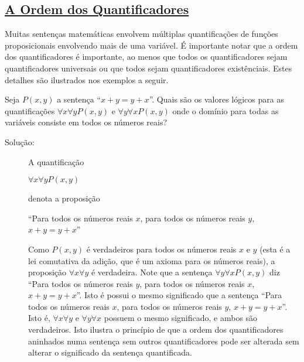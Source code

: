 \subsection*{\underline{A Ordem dos Quantificadores}}

Muitas sentenças matemáticas envolvem múltiplas quantificações de funções
proposicionais envolvendo mais de uma variável. É importante notar que a ordem
dos quantificadores é importante, ao menos que todos os quantificadores sejam
quantificadores universais ou que todos sejam quantificadores existênciais.
Estes detalhes são ilustrados nos exemplos a seguir.

\begin{exmp}
\label{exem150}
Seja $P(x,y)$ a sentença ``$x+y=y+x$''. Quais são os valores lógicos para as
quantificações $\forall x\forall yP(x,y)$ e $\forall y\forall xP(x,y)$ onde o
domínio para todas as variáveis consiste em todos os números reais?
\begin{description}
\item[Solução:]A quantificação
\begin{center}
$\forall x\forall yP(x,y)$
\end{center}
denota a proposição
\begin{center}
``Para todos os números reais $x$, para todos os números reais $y$, $x+y=y+x$''
\end{center}
Como $P(x,y)$ é verdadeiros para todos os números reais $x$ e $y$ (esta é a lei
comutativa da adição, que é um axioma para os números reais), a proposição
$\forall x\forall y$ é verdadeira. Note que a sentença $\forall y\forall
xP(x,y)$ diz ``Para todos os números reais $y$, para todos os números reais $x$,
$x+y=y+x$''. Isto é possui o mesmo significado que a sentença ``Para todos os
números reais $x$, para todos os números reais $y$, $x+y=y+x$''. Isto é,
$\forall x\forall y$ e $\forall y\forall x$ possuem o mesmo significado, e ambos
são verdadeiros. Isto ilustra o princípio de que a ordem dos quantificadores
aninhados numa sentença sem outros quantificadores pode ser alterada sem alterar
o significado da sentença quantificada.
\end{description}
\end{exmp}


